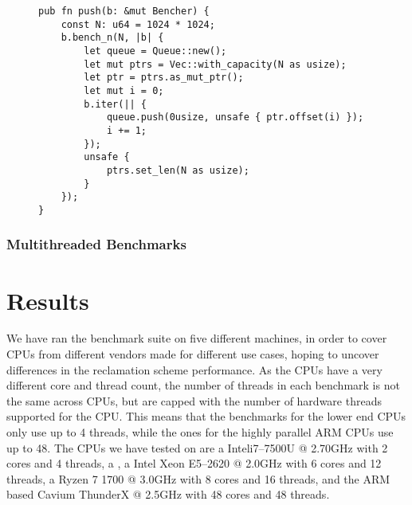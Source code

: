 \documentclass[b5paper]{report}
\begin{document}
\begin{figure}[ht]
  \begin{lstlisting}[caption=Microbenchmark of a data structure without memory
  reclamation,label=lst:bench-nothing]
pub fn push(b: &mut Bencher) {
    const N: u64 = 1024 * 1024;
    b.bench_n(N, |b| {
        let queue = Queue::new();
        let mut ptrs = Vec::with_capacity(N as usize);
        let ptr = ptrs.as_mut_ptr();
        let mut i = 0;
        b.iter(|| {
            queue.push(0usize, unsafe { ptr.offset(i) });
            i += 1;
        });
        unsafe {
            ptrs.set_len(N as usize);
        }
    });
}
  \end{lstlisting}
\end{figure}


\subsection{Multithreaded Benchmarks}




\chapter{Results}\label{ch:results}

We have ran the benchmark suite on five different machines, in order to cover
CPUs from different vendors made for different use cases, hoping to uncover
differences in the reclamation scheme performance. As the CPUs have a very
different core and thread count, the number of threads in each benchmark is not
the same across CPUs, but are capped with the number of hardware threads
supported for the CPU\@. This means that the benchmarks for the lower end CPUs
only use up to 4 threads, while the ones for the highly parallel ARM CPUs use up
to 48. 
The CPUs we have tested on are a
Intel\textregistered{}i7--7500U @ 2.70GHz with 2 cores and 4 threads,
a ,
a Intel\textregistered{} Xeon\textregistered{} E5--2620 @ 2.0GHz with 6
cores and 12 threads,
a Ryzen 7 1700 @ 3.0GHz with 8 cores and 16 threads,
and the ARM based Cavium ThunderX @ 2.5GHz with 48 cores and 48 threads.
\end{document}
